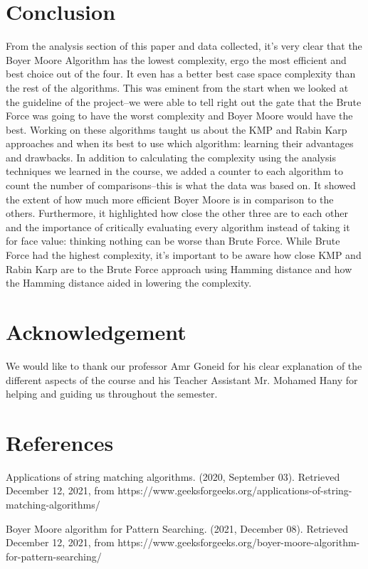 \documentclass{article}
\theoremstyle{plain}
\begin{document}
\section*{Conclusion}
From the analysis section of this paper and data collected, it’s very clear that the Boyer Moore Algorithm has the lowest complexity, ergo the most efficient and best choice out of the four. It even has a better best case space complexity than the rest of the algorithms. This was eminent from the start when we looked at the guideline of the project–we were able to tell right out the gate that the Brute Force was going to have the worst complexity and Boyer Moore would have the best. Working on these algorithms taught us about the KMP and Rabin Karp approaches and when its best to use which algorithm: learning their advantages and drawbacks. In addition to calculating the complexity using the analysis techniques we learned in the course, we added a counter to each algorithm to count the number of comparisons–this is what the data was based on. It showed the extent of how much more efficient Boyer Moore is in comparison to the others. Furthermore, it highlighted how close the other three are to each other and the importance of critically evaluating every algorithm instead of taking it for face value: thinking nothing can be worse than Brute Force. While Brute Force had the highest complexity, it’s important to be aware how close KMP and Rabin Karp are to the Brute Force approach using Hamming distance and how the Hamming distance aided in lowering the complexity.

\section*{Acknowledgement}
We would like to thank our professor Amr Goneid for his clear explanation of the different aspects of the course and his Teacher Assistant Mr. Mohamed Hany for helping and guiding us throughout the semester.
\newpage
\section*{References}
Applications of string matching algorithms. (2020, September 03). Retrieved December 12, 2021, from https://www.geeksforgeeks.org/applications-of-string-matching-algorithms/

Boyer Moore algorithm for Pattern Searching. (2021, December 08). Retrieved December 12, 2021, from https://www.geeksforgeeks.org/boyer-moore-algorithm-for-pattern-searching/
\end{document}

